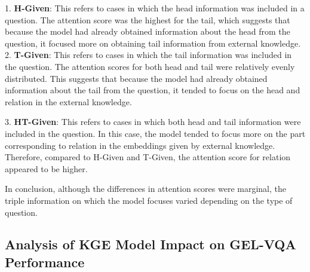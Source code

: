 \documentclass[letterpaper]{article} %
\begin{document}
\begin{itemize}
1. \textbf{H-Given}: This refers to cases in which the head information was included in a question. The attention score was the highest for the tail, which suggests that because the model had already obtained information about the head from the question, it focused more on obtaining tail information from external knowledge.
2. \textbf{T-Given}: This refers to cases in which the tail information was included in the question. The attention scores for both head and tail were relatively evenly distributed. This suggests that because the model had already obtained information about the tail from the question, it tended to focus on the head and relation in the external knowledge.

3. \textbf{HT-Given}: This refers to cases in which both head and tail information were included in the question. In this case, the model tended to focus more on the part corresponding to relation in the embeddings given by external knowledge. Therefore, compared to H-Given and T-Given, the attention score for relation appeared to be higher.
\end{itemize}  In conclusion, although the differences in attention scores were marginal, the triple information on which the model focuses varied depending on the type of question.

\vspace{-0.80mm}
\subsection{Analysis of KGE Model Impact on GEL-VQA Performance}
\end{document}
